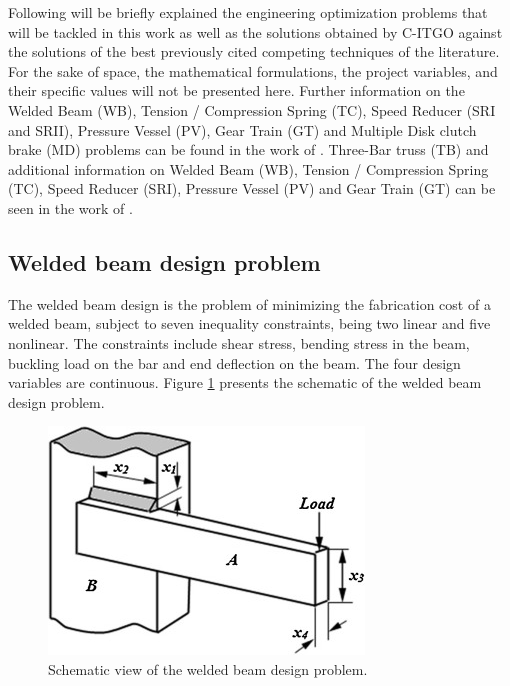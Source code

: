 Following will be briefly explained the engineering optimization problems that will be tackled in this work as well as the solutions obtained by C-ITGO against the solutions of the best previously cited competing techniques of the literature. For the sake of space, the mathematical formulations, the project variables, and their specific values will not be presented here. Further information on the Welded Beam (WB), Tension / Compression Spring (TC), Speed Reducer (SRI and SRII), Pressure Vessel (PV), Gear Train (GT) and Multiple Disk clutch brake (MD) problems can be found in the work of \cite{IAPSO}. Three-Bar truss (TB) and additional information on Welded Beam (WB), Tension / Compression Spring (TC), Speed Reducer (SRI), Pressure Vessel (PV) and Gear Train (GT) can be seen in the work of \cite{MBA}.



\subsection{Welded beam design problem}

The welded beam design \citep{WB} is the problem of minimizing the fabrication cost of a welded beam, subject to seven inequality constraints, being two linear and five nonlinear. The constraints include shear stress, bending stress in the beam, buckling load on the bar and end deflection on the beam. The four design variables are continuous. Figure \ref{fig:WB} presents the schematic of the welded beam design problem.

\begin{figure}[h]
\begin{center}
\includegraphics[scale=0.7]{Imgs/WB.jpg}
\end{center}
\captionsetup{justification=centering}
\caption{Schematic view of the welded beam design problem.}\label{fig:WB}
\end{figure}

